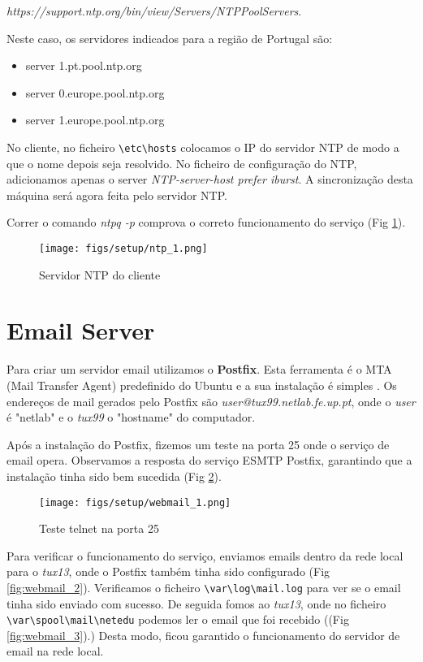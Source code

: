 \textit{https://support.ntp.org/bin/view/Servers/NTPPoolServers}.

Neste caso, os servidores indicados para a região de Portugal são:
\begin{itemize}
    \item server 1.pt.pool.ntp.org
    \item server 0.europe.pool.ntp.org
    \item server 1.europe.pool.ntp.org
\end{itemize}

No cliente, no ficheiro \verb|\etc\hosts| colocamos o IP do servidor NTP de modo a que o nome depois seja resolvido.
No ficheiro de configuração do NTP, adicionamos apenas o server \textit{NTP-server-host prefer iburst}.
A sincronização desta máquina será agora feita pelo servidor NTP.

Correr o comando \textit{ntpq -p} comprova o correto funcionamento do serviço (Fig \ref{fig:ntp_1}).

\begin{figure}
    \centering
    \texttt{[image: figs/setup/ntp\_1.png]}
    \caption{Servidor NTP do cliente}
    \label{fig:ntp_1}
\end{figure}


\section{Email Server}

Para criar um servidor email utilizamos o \textbf{Postfix}. Esta ferramenta é o MTA (Mail Transfer Agent) predefinido do Ubuntu e a sua instalação é simples \cite{postfix}.
Os endereços de mail gerados pelo Postfix são \textit{user@tux99.netlab.fe.up.pt}, onde o \textit{user} é "netlab" e o \textit{tux99} o "hostname" do computador.

Após a instalação do Postfix, fizemos um teste na porta 25 onde o serviço de email opera. Observamos a resposta do serviço ESMTP Postfix,
garantindo que a instalação tinha sido bem sucedida (Fig \ref{fig:webmail_1}).
\begin{figure}
    \centering
    \texttt{[image: figs/setup/webmail\_1.png]}
    \caption{Teste telnet na porta 25}
    \label{fig:webmail_1}
\end{figure}

Para verificar o funcionamento do serviço, enviamos emails dentro da rede local para o \textit{tux13}, onde o Postfix também tinha sido configurado (Fig \ref{fig:webmail_2}).
Verificamos o ficheiro \verb|\var\log\mail.log| para ver se o email tinha sido enviado com sucesso.
De seguida fomos ao \textit{tux13}, onde no ficheiro \verb|\var\spool\mail\netedu| podemos ler o email que foi recebido ((Fig \ref{fig:webmail_3}).)
Desta modo, ficou garantido o funcionamento do servidor de email na rede local.

